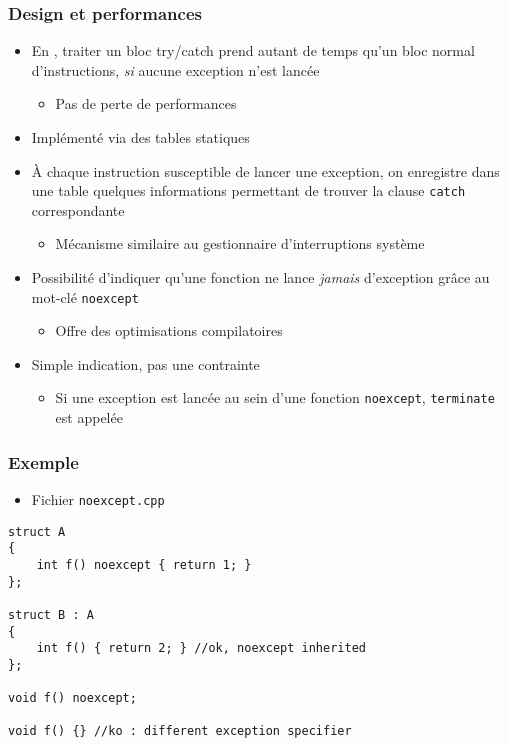 \begin{frame}
\frametitle{Design et performances}
\begin{itemize}[<+->]
\item En \cpp, traiter un bloc try/catch prend autant de temps qu'un bloc normal d'instructions, \emph{si} aucune exception n'est lancée
	\begin{itemize}
	\item Pas de perte de performances
	\end{itemize}
\item Implémenté via des tables statiques
\item À chaque instruction susceptible de lancer une exception, on enregistre dans une table quelques informations permettant de trouver la clause \lstinline|catch| correspondante
	\begin{itemize}
	\item Mécanisme similaire au gestionnaire d'interruptions système
	\end{itemize}
\item Possibilité d'indiquer qu'une fonction ne lance \emph{jamais} d'exception grâce au mot-clé \lstinline|noexcept|
	\begin{itemize}
	\item Offre des optimisations compilatoires
	\end{itemize}
\item Simple indication, pas une contrainte
	\begin{itemize}
	\item Si une exception est lancée au sein d'une fonction \lstinline|noexcept|, \texttt{terminate} est appelée
	\end{itemize}
\end{itemize}
\end{frame}

\begin{frame}[containsverbatim]
\frametitle{Exemple}
\begin{itemize}
\item Fichier \texttt{noexcept.cpp}
\end{itemize}
\begin{lstlisting}
struct A
{
	int f() noexcept { return 1; }
};

struct B : A
{
	int f() { return 2; } //ok, noexcept inherited
};

void f() noexcept;

void f() {} //ko : different exception specifier
\end{lstlisting}
\end{frame}

